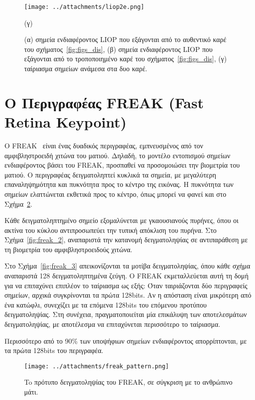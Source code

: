 \begin{figure}[!h]
\begin{minipage}[c]{1.0\linewidth}
\centering
\texttt{[image: ../attachments/liop2e.png]}
\caption*{(γ)}
\label{fig:liop_6}
\end{minipage}
\caption{(α) σημεία ενδιαφέροντος LIOP που εξάγονται από το αυθεντικό καρέ του σχήματος~\ref{fig:figs_dis},
(β) σημεία ενδιαφέροντος LIOP που εξάγονται από το τροποποιημένο καρέ του σχήματος~\ref{fig:figs_dis}, 
(γ) ταίριασμα σημείων ανάμεσα στα δυο καρέ.}
\label{fig:liop_dis_figs}
\end{figure}


\newpage   %

\section{Ο Περιγραφέας FREAK (Fast Retina Keypoint)}

O FREAK~\cite{alahi2012freak} είναι ένας δυαδικός περιγραφέας, εμπνευσμένος από τον αμφιβληστροειδή χιτώνα του ματιού. Δηλαδή, το μοντέλο εντοπισμού σημείων ενδιαφέροντος βάσει του FREAK, προσπαθεί να προσομοιώσει 
την βιομετρία του ματιού. O περιγραφέας δειγματοληπτεί κυκλικά τα σημεία, με μεγαλύτερη επαναληψημότητα και πυκνότητα προς το κέντρο της εικόνας. Η πυκνότητα των σημείων 
ελαττώνεται εκθετικά προς το κέντρο, όπως μπορεί να φανεί και στο Σχήμα~\ref{fig:freak_pattern}. \par
Κάθε δειγματοληπτημένο σημείο εξομαλύνεται με γκαουσιανούς πυρήνες, όπου οι ακτίνα του κύκλου αντιπροσωπεύει την τυπική απόκλιση του πυρήνα.
Στο Σχήμα~\ref{fig:freak_2}, αναπαριστά την κατανομή δειγματοληψίας σε αντιπαράθεση με τη βιομετρία του αμφιβληστροειδούς χιτώνα.\par
Στο Σχήμα~\ref{fig:freak_3} απεικονίζονται τα μοτίβα δειγματοληψίας, όπου κάθε σχήμα αναπαριστά 128 δειγματοληπτημένα ζεύγη.
Ο FREAK εκμεταλλεύεται αυτή τη δομή για να επιταχύνει επιπλέον το ταίριασμα ως εξής: Όταν ταιριάζονται δύο περιγραφείς σημείων, αρχικά συγκρίνονται τα 
πρώτα 128bits. Αν η απόσταση είναι μικρότερη από ένα κατώφλι, συνεχίζει με τα επόμενα 128bits του επόμενου προτύπου δειγματοληψίας.
Στη συνέχεια, πραγματοποιείται μία επικάλυψη των αποτελεσμάτων δειγματοληψίας, με αποτέλεσμα να επιταχύνεται περισσότερο το ταίριασμα.\par
Περισσότερο από το 90\% των υποψήφιων σημείων ενδιαφέροντος απορρίπτονται, με τα πρώτα 128bits του περιγραφέα.

\vspace{2cm}
 \begin{figure}[!ht]
 \begin{minipage}[c]{1.0\linewidth}
 \centering
\texttt{[image: ../attachments/freak\_pattern.png]}
\end{minipage}
\caption{To πρότυπο δειγματοληψίας του FREAK, σε σύγκριση με το ανθρώπινο μάτι.}
\label{fig:freak_pattern}
\end{figure}

